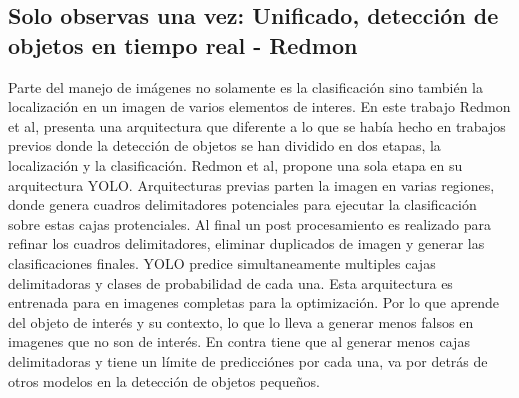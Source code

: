 \subsection{Solo observas una vez: Unificado, detección de objetos en tiempo real - Redmon}
Parte del manejo de imágenes no solamente es la clasificación sino también la localización en un imagen de varios elementos de interes. En este trabajo Redmon et al, presenta una arquitectura que diferente a lo que se había hecho en trabajos previos donde la detección de objetos se han dividido en dos etapas, la localización y la clasificación. Redmon et al, propone una sola etapa en su arquitectura YOLO. Arquitecturas previas parten la imagen en varias regiones, donde genera cuadros delimitadores potenciales para ejecutar la clasificación sobre estas cajas protenciales. Al final un post procesamiento es realizado para refinar los cuadros delimitadores, eliminar duplicados de imagen y generar las clasificaciones finales.
YOLO predice simultaneamente multiples cajas delimitadoras y clases de probabilidad de cada una. Esta arquitectura es entrenada para en imagenes completas para la optimización. Por lo que aprende del objeto de interés y su contexto, lo que lo lleva a generar menos falsos en imagenes que no son de interés. En contra tiene que al generar menos cajas delimitadoras y tiene un límite de predicciónes por cada una, va por detrás de otros modelos en la detección de objetos pequeños.